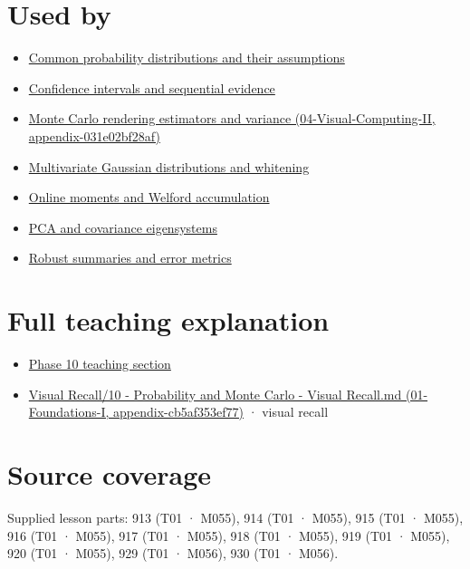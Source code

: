 \section{Used by}\label{appendix-54c383df9992-used-by}

\begin{itemize}
\tightlist
\item
  \hyperref[appendix-a2360b435383]{Common probability distributions and their assumptions}
\item
  \hyperref[appendix-c83016554b1e]{Confidence intervals and sequential evidence}
\item
  \href{../04-Visual-Computing-II/main.pdf\#nameddest=appendix-031e02bf28af}{Monte Carlo rendering estimators and variance (04-Visual-Computing-II, appendix-031e02bf28af)}
\item
  \hyperref[appendix-12bbe185dbe5]{Multivariate Gaussian distributions and whitening}
\item
  \hyperref[appendix-33237f0f618b]{Online moments and Welford accumulation}
\item
  \hyperref[appendix-ad175ef3c5bf]{PCA and covariance eigensystems}
\item
  \hyperref[appendix-bcc44e9d3d02]{Robust summaries and error metrics}
\end{itemize}

\section{Full teaching explanation}\label{appendix-54c383df9992-full-teaching-explanation}

\begin{itemize}
\tightlist
\item
  \href{Continuous\%20Notes/Computing\%20Foundations\%20-\%20From\%20Bits\%20to\%20C++\%20and\%20Systems\%20APIs\#3.\%20Expected\%20values\%20describe\%20centers;\%20covariance\%20describes\%20dependence}{Phase 10 teaching section}
\item
  \href{../01-Foundations-I/main.pdf\#nameddest=appendix-cb5af353ef77}{Visual Recall/10 - Probability and Monte Carlo - Visual Recall.md (01-Foundations-I, appendix-cb5af353ef77)} · visual recall
\end{itemize}

\section{Source coverage}\label{appendix-54c383df9992-source-coverage}

Supplied lesson parts: 913 (T01 · M055), 914 (T01 · M055), 915 (T01 · M055), 916 (T01 · M055), 917 (T01 · M055), 918 (T01 · M055), 919 (T01 · M055), 920 (T01 · M055), 929 (T01 · M056), 930 (T01 · M056).
